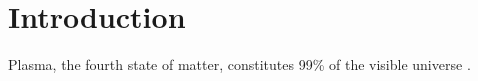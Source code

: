 \chapter*{Introduction}

Plasma, the fourth state of matter, constitutes 99\% of the visible universe \cite{plasma-intro}. 